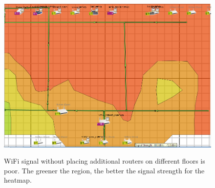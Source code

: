\documentclass[10pt]{sensys-proc}
\newcommand{\redcolor}[1]{\textcolor{red}{#1}}
\begin{document}
\begin{figure}[t!]
{          \includegraphics[scale=0.085]{./figures/without_.png}}
          \hspace{1mm}
              \vspace{-3mm}
    \caption{WiFi signal without placing additional routers on different floors is poor. The greener the region, the better the signal strength for the heatmap. 
}
\end{figure}
\end{document}

